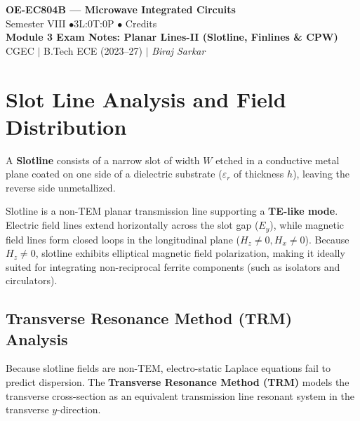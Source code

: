 \documentclass[10pt,a4paper]{article}
\begin{document}
\begin{center}
  {\LARGE\bfseries\color{myred} OE-EC804B --- Microwave Integrated Circuits}\\[5pt]
  {\normalsize\color{mydark} Semester VIII \quad$\bullet$\quad 3L:0T:0P \quad$\bullet$ Credits}\\[3pt]
  {\normalsize\color{myteal}\textbf{Module 3 Exam Notes: Planar Lines-II (Slotline, Finlines \& CPW)}}\\[3pt]
  {\small\color{mydark} CGEC \;$|$\; B.Tech ECE (2023--27) \;$|$\; \textit{Biraj Sarkar}}
\end{center}
\vspace{2pt}
\noindent{\color{myred}\rule{\linewidth}{1.5pt}}
\vspace{2pt}

\hypersetup{linkcolor=mydark}
\tableofcontents
\hypersetup{linkcolor=myteal}
\newpage

\section{Slot Line Analysis and Field Distribution}

A \textbf{Slotline} consists of a narrow slot of width $W$ etched in a conductive metal plane coated on one side of a dielectric substrate ($\varepsilon_r$ of thickness $h$), leaving the reverse side unmetallized.

\begin{tcolorbox}[defbox, title={Slotline Structure \& Propagation Mode}]
  Slotline is a non-TEM planar transmission line supporting a \textbf{TE-like mode}. Electric field lines extend horizontally across the slot gap ($E_y$), while magnetic field lines form closed loops in the longitudinal plane ($H_z \ne 0, H_x \ne 0$). Because $H_z \ne 0$, slotline exhibits elliptical magnetic field polarization, making it ideally suited for integrating non-reciprocal ferrite components (such as isolators and circulators).
\end{tcolorbox}

\subsection{Transverse Resonance Method (TRM) Analysis}
Because slotline fields are non-TEM, electro-static Laplace equations fail to predict dispersion. The \textbf{Transverse Resonance Method (TRM)} models the transverse cross-section as an equivalent transmission line resonant system in the transverse $y$-direction.
\end{document}
